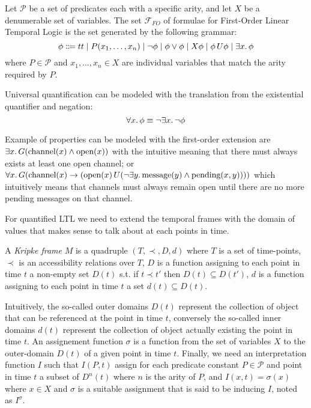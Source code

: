 \begin{definition}
  Let $\mathcal{P}$ be a set of predicates each with a specific arity, and let $X$ be a denumerable set of variables.
  The set $\mathcal{F}_{FO}$ of formulae for First-Order Linear Temporal Logic is the set generated by the following grammar:
  \[
    \phi \Coloneqq tt \;|\; P(x_1, \ldots, x_n)
                      \;|\; \neg\phi
                      \;|\; \phi \lor \phi
                      \;|\; X{\phi}
                      \;|\; {\phi}\,U {\phi}
                      \;|\; \exists {x} \ldotp {\phi}
  \]
  where $P \in \mathcal{P}$ and $x_1, \ldots, x_n \in X$ are individual variables that match the arity required by $P$.
\end{definition}
Universal quantification can be modeled with the translation from the existential quantifier and negation:
\[
  \forall {x} \ldotp {\phi} \equiv \neg\exists {x} \ldotp {\neg\phi}
\]

Example of properties can be modeled with the first-order extension are $\exists {x} \ldotp {G(\text{channel}(x) \land
\text{open}(x))}$ with the intuitive meaning that there must always exists at least one open channel; or
$\forall {x} \ldotp {G(\text{channel}(x) \to ({\text{open}(x)}\,U {(\neg\exists {y} \ldotp {\text{message}(y) \land \text{pending}(x,
y)})}))}$
which intuitively means that channels must always remain open until there are no more pending messages on that channel.

For quantified LTL we need to extend the temporal frames with the domain of values that makes sense to talk about at
each points in time.

\begin{definition}
  A \emph{Kripke frame} $M$ is a quadruple $(T, \prec, D, d)$ where $T$ is a set of time-points, $\prec$ is an
  accessibility
  relations over $T$, $D$ is a function assigning to each point in time $t$ a non-empty set $D(t)$ s.t. if $t \prec t'$
  then $D(t) \subseteq D(t')$, $d$ is a function assigning to each point in time $t$ a set $d(t) \subseteq D(t)$.
\end{definition}
Intuitively, the so-called outer domains $D(t)$ represent the collection of object that can be referenced at the point
in time $t$, conversely the so-called inner domains $d(t)$ represent the collection of object actually existing the
point in time $t$. An assignement function $\sigma$ is a function from the set of variables $X$ to the outer-domain
$D(t)$ of a given point in time $t$. Finally, we need an interpretation function $I$ such that $I(P, t)$ assign for each
predicate constant $P \in \mathcal{P}$ and point in time $t$ a subset of $D^n(t)$ where $n$ is the arity of $P$, and
$I(x, t) = \sigma(x)$ where $x \in X$ and $\sigma$ is a suitable assignment that is said to be inducing $I$, noted as
$I^\sigma$.

